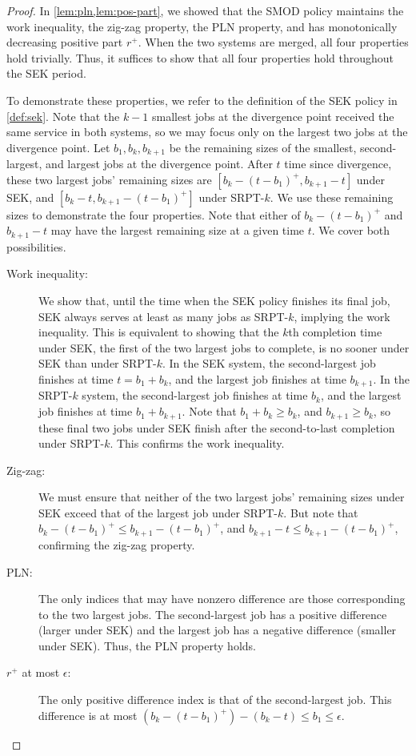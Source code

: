 \documentclass[acmsmall]{acmart}
\begin{document}
\begin{proof}
    In \cref{lem:pln,lem:pos-part}, we showed that the SMOD policy maintains the work inequality, the zig-zag property, the PLN property,
    and has monotonically decreasing positive part $r^+$.
    When the two systems are merged, all four properties hold trivially.
    Thus, it suffices to show that all four properties hold throughout the SEK period.

    To demonstrate these properties, we refer to the definition of the SEK policy in \cref{def:sek}.
    Note that the $k-1$ smallest jobs at the divergence point received the same service in both systems,
    so we may focus only on the largest two jobs at the divergence point.
    Let $b_1, b_k, b_{k+1}$ be the remaining sizes of the smallest, second-largest, and largest jobs
    at the divergence point.
    After $t$ time since divergence, these two largest jobs' remaining sizes are $[b_k - (t - b_1)^+, b_{k+1} - t]$
    under SEK, and $[b_k - t, b_{k+1} - (t - b_1)^+]$ under SRPT-$k$.
    We use these remaining sizes to demonstrate the four properties.
    Note that either of $b_k - (t - b_1)^+$ and $b_{k+1} - t$
    may have the largest remaining size at a given time $t$. We cover both possibilities.
    \begin{description}
        \item[Work inequality:] We show that, until the time when the SEK policy finishes its final job,
        SEK always serves at least as many jobs as SRPT-$k$, implying the work inequality.
        This is equivalent to showing that the $k$th completion time under SEK,
        the first of the two largest jobs to complete,
        is no sooner under SEK than under SRPT-$k$.
        In the SEK system, the second-largest job finishes at time $t = b_1 + b_k$, and the largest job finishes at time $b_{k+1}$. In the SRPT-$k$ system, the second-largest job finishes at time $b_k$, and the largest job finishes at time $b_1 + b_{k+1}$.
        Note that $b_1 + b_k \ge b_k$, and $b_{k+1} \ge b_k$,
        so these final two jobs under SEK finish after the second-to-last completion under SRPT-$k$.
        This confirms the work inequality.
        \item[Zig-zag:] We must ensure that neither of the two largest jobs' remaining sizes under SEK
        exceed that of the largest job under SRPT-$k$.
        But note that $b_k - (t - b_1)^+ \le b_{k+1} - (t - b_1)^+$,
        and $b_{k+1} - t \le b_{k+1} - (t - b_1)^+$, confirming the zig-zag property.
        \item[PLN:] The only indices that may have nonzero difference are those corresponding to the two largest jobs. The second-largest job has a positive difference (larger under SEK) and the largest job has a negative difference (smaller under SEK). Thus, the PLN property holds.
        \item[$r^+$ at most $\epsilon$:] The only positive difference index is that of the second-largest job.
        This difference is at most $(b_k - (t - b_1)^+) - (b_k - t) \le b_1 \le \epsilon$.
        \qedhere
    \end{description}
\end{proof}
\end{document}
